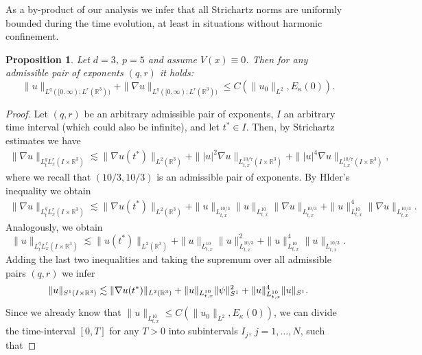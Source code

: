 \documentclass[a4paper,leqno]{amsart}
\theoremstyle{plain}
\newtheorem{proposition}[theorem]{Proposition}
\theoremstyle{definition}
\numberwithin{equation}{section}
\begin{document}
As a by-product of our analysis we infer that all Strichartz norms are uniformly bounded during the time evolution, at least in situations without harmonic confinement. 
\begin{proposition}
Let $d=3$, $p=5$ and assume $V(x)\equiv 0$. Then for any admissible pair of exponents $(q,r)$ it holds:
\begin{equation*}
\| u \|_{L^q([0, \infty);L^r({{\mathbb R}}^3))}+\|\nabla u \|_{L^q([0, \infty);L^r({{\mathbb R}}^3))}
{\leqslant} C(\|u_0\|_{L^2}, E_\kappa(0)).
\end{equation*}
\end{proposition}
\begin{proof}
Let $(q, r)$ be an arbitrary admissible pair of exponents, $I$ an arbitrary time interval (which could also be infinite), and let $t^\ast\in I$. 
Then, by Strichartz estimates we have
\begin{multline*}
\|\nabla u \|_{L^q_tL^r_x(I\times{{\mathbb R}}^3)}\lesssim\|\nabla u (t^\ast)\|_{L^2({{\mathbb R}}^3)}
+\||u |^2\nabla u \|_{L^{10/7}_{t, x}(I\times{{\mathbb R}}^3)}
+\||u |^4\nabla u \|_{L^{10/7}_{t, x}(I\times{{\mathbb R}}^3)},
\end{multline*}
where we recall that $(10/3, 10/3)$ is an admissible pair of exponents. By Hlder's inequality we obtain
\begin{align*}\label{eq:strich1}
\|\nabla u \|_{L^q_tL^r_x(I\times{{\mathbb R}}^3)}\lesssim \|\nabla u (t^\ast)\|_{L^2({{\mathbb R}}^3)}
+\|u\|_{L^{10/3}_{t, x}}\|u \|_{L^{10}_{t, x}}\|\nabla u \|_{L^{10/3}_{t, x}} +\|u \|_{L^{10}_{t, x}}^4\|\nabla u \|_{L^{10/3}_{t, x}}.
\end{align*}
Analogously, we obtain
\begin{equation*}\label{eq:strich2}
\|u \|_{L^q_tL^r_x(I\times{{\mathbb R}}^3)}\lesssim\|u(t^\ast)\|_{L^2({{\mathbb R}}^3)}
+\|u\|_{L^{10}_{t, x}}\|u\|_{L^{10/3}_{t, x}}^2
+\|u\|_{L^{10}_{t, x}}^4\|u\|_{L^{10/3}_{t, x}}.
\end{equation*}
Adding the last two inequalities and taking the supremum over all admissible pairs $(q, r)$ we infer 
\begin{equation*}\label{eq:strich_tot}
\|u\|_{S^1(I\times{{\mathbb R}}^3)}\lesssim\|\nabla u(t^\ast)\|_{L^2({{\mathbb R}}^3)}
+\|u\|_{L^{10}_{t, x}}\|\psi\|_{S^1}^2\\
+\|u\|_{L^{10}_{t, x}}^4\|u\|_{S^1}.
\end{equation*}
Since we already know that $\|u\|_{L^{10}_{t, x}} {\leqslant} C(\|u_0\|_{L^2}, E_\kappa(0))$, we can divide the time-interval $[0, T]$ for any $T>0$ into subintervals $I_j$, $j=1, \dotsc, N$, such that

\end{proof}
\end{document}
